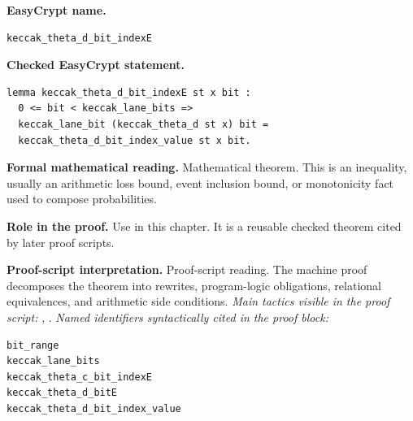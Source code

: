 \begin{formaltheorem}
\noindent\textbf{EasyCrypt name.}
\begin{lstlisting}[language=EasyCrypt,basicstyle=\ttfamily\scriptsize]
keccak_theta_d_bit_indexE
\end{lstlisting}
\noindent\textbf{Checked EasyCrypt statement.}
\begin{lstlisting}[language=EasyCrypt,basicstyle=\ttfamily\scriptsize]
lemma keccak_theta_d_bit_indexE st x bit :
  0 <= bit < keccak_lane_bits =>
  keccak_lane_bit (keccak_theta_d st x) bit =
  keccak_theta_d_bit_index_value st x bit.
\end{lstlisting}
\noindent\textbf{Formal mathematical reading.}
Mathematical theorem. This is an inequality, usually an arithmetic loss bound, event inclusion bound, or monotonicity fact used to compose probabilities.

\noindent\textbf{Role in the proof.}
Use in this chapter. It is a reusable checked theorem cited by later proof scripts.

\noindent\textbf{Proof-script interpretation.}
Proof-script reading. The machine proof decomposes the theorem into rewrites, program-logic obligations, relational equivalences, and arithmetic side conditions.
\emph{Main tactics visible in the proof script:} , .
\emph{Named identifiers syntactically cited in the proof block:}
\begin{lstlisting}[language=EasyCrypt,basicstyle=\ttfamily\scriptsize]
bit_range
keccak_lane_bits
keccak_theta_c_bit_indexE
keccak_theta_d_bitE
keccak_theta_d_bit_index_value
\end{lstlisting}

\end{formaltheorem}


